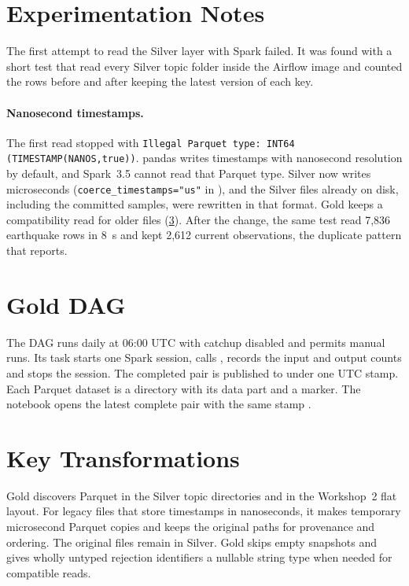 \documentclass[a4paper,11pt,oneside]{book}
\begin{document}
\section{Experimentation Notes}
\label{sec:spark-experiments}
The first attempt to read the Silver layer with Spark failed. It was found with a short test that read every Silver topic folder inside the Airflow image and counted the rows before and after keeping the latest version of each key.

\paragraph{Nanosecond timestamps.} The first read stopped with \texttt{Illegal Parquet type: INT64 (TIMESTAMP(NANOS,true))}. pandas writes timestamps with nanosecond resolution by default, and Spark~3.5 cannot read that Parquet type. Silver now writes microseconds (\texttt{coerce\_timestamps="us"} in ), and the Silver files already on disk, including the committed samples, were rewritten in that format. Gold keeps a compatibility read for older files (\cref{sec:gold-transforms}). After the change, the same test read 7,836 earthquake rows in 8~s and kept 2,612 current observations, the duplicate pattern that  reports.

\section{Gold DAG}
The  DAG runs daily at 06:00 UTC with catchup disabled and permits manual runs. Its  task starts one Spark session, calls , records the input and output counts and stops the session. The completed pair is published to  under one UTC stamp. Each Parquet dataset is a directory with its data part and a  marker. The notebook opens the latest complete pair with the same stamp \cite{airflow}.

\section{Key Transformations}
\label{sec:gold-transforms}
Gold discovers Parquet in the Silver topic directories and in the Workshop~2 flat layout. For legacy files that store timestamps in nanoseconds, it makes temporary microsecond Parquet copies and keeps the original paths for provenance and ordering. The original files remain in Silver. Gold skips empty snapshots and gives wholly untyped rejection identifiers a nullable string type when needed for compatible reads.
\end{document}
